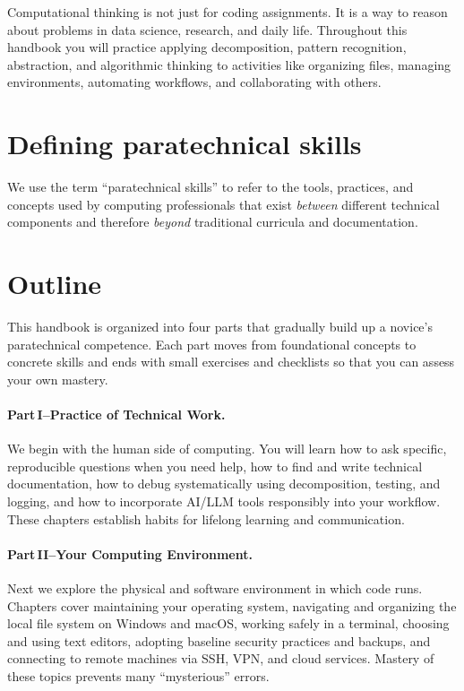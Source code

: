 Computational thinking is not just for coding assignments.  It is a way to reason about problems in data science, research, and daily life.  Throughout this handbook you will practice applying decomposition, pattern recognition, abstraction, and algorithmic thinking to activities like organizing files, managing environments, automating workflows, and collaborating with others.

\section{Defining paratechnical skills}
We use the term ``paratechnical skills'' to refer to the tools, practices, and concepts used by computing professionals that exist \textit{between} different technical components and therefore \textit{beyond} traditional curricula and documentation. 

\section{Outline}
This handbook is organized into four parts that gradually build up a novice’s paratechnical competence.  Each part moves from foundational concepts to concrete skills and ends with small exercises and checklists so that you can assess your own mastery.

\paragraph{Part\,I–Practice of Technical Work.}  We begin with the human side of computing.  You will learn how to ask specific, reproducible questions when you need help, how to find and write technical documentation, how to debug systematically using decomposition, testing, and logging, and how to incorporate AI/LLM tools responsibly into your workflow.  These chapters establish habits for lifelong learning and communication.

\paragraph{Part\,II–Your Computing Environment.}  Next we explore the physical and software environment in which code runs.  Chapters cover maintaining your operating system, navigating and organizing the local file system on Windows and macOS, working safely in a terminal, choosing and using text editors, adopting baseline security practices and backups, and connecting to remote machines via SSH, VPN, and cloud services.  Mastery of these topics prevents many “mysterious” errors.

